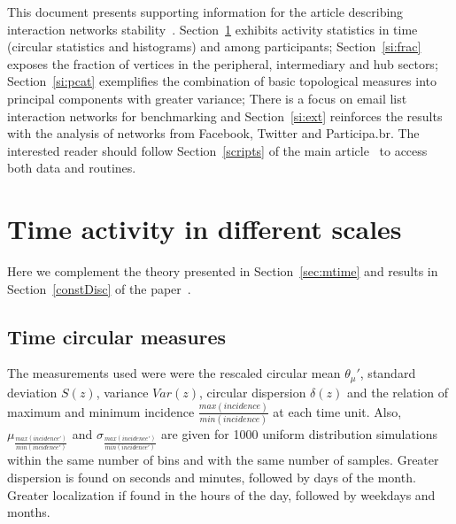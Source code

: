 \documentclass[%
 aip,
 jmp,%
 amsmath,amssymb,
 reprint,%
 floatfix,
]{revtex4-1}
\begin{document}


\date{\today}%

\maketitle

\tableofcontents


\vfill
\newpage

This document presents supporting information for the article describing interaction networks stability~\cite{tpaper}.
Section~\ref{sec:time} exhibits activity statistics in time (circular statistics and histograms) and among participants;
Section~\ref{si:frac} exposes the fraction of vertices in the peripheral, intermediary and hub sectors;
Section~\ref{si:pcat} exemplifies the combination of basic topological measures into principal components with greater variance;
There is a focus on email list interaction networks for benchmarking and
Section~\ref{si:ext} reinforces the results with the analysis of networks from Facebook, Twitter and Participa.br.
The interested reader should follow Section~\ref{scripts} of the main article~\cite{tpaper} to access both data and routines.

\section{Time activity in different scales}\label{sec:time}
Here we complement the theory presented in Section~\ref{sec:mtime} and results in Section~\ref{constDisc} of the paper~\cite{tpaper}.

\subsection{Time circular measures}\label{si:circ}
The measurements used were were the rescaled circular mean $\theta_\mu'$, standard deviation $S(z)$, variance $Var(z)$, circular dispersion $\delta(z)$ and the relation of maximum and minimum incidence $\frac{max(incidence)}{min(incidence)}$ at each time unit.
Also, $ \mu_{\frac{max(incidence')}{min(incidence')}} $ and $ \sigma_{\frac{max(incidence')}{min(incidence')} }$ are given for 1000 uniform distribution simulations within the same number of bins and with the same number of samples. Greater dispersion is found on seconds and minutes, followed
by days of the month. Greater localization if found in the hours of the day, followed by weekdays and months.
\end{document}
